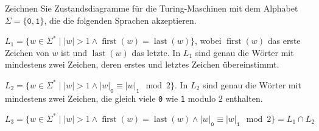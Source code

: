 Zeichnen Sie Zustandsdiagramme für die Turing-Maschinen
mit dem Alphabet $\Sigma=\{\texttt{0},\texttt{1}\}$, die die folgenden
Sprachen akzeptieren.
\begin{teilaufgaben}
\item
\(
L_1
=
\{ w\in\Sigma^*
\mid 
|w| > 1
\wedge
\operatorname{first}(w) = \operatorname{last}(w)
\}
\),
wobei $\operatorname{first}(w)$ das erste Zeichen von $w$
ist und $\operatorname{last}(w)$ das letzte.
In $L_1$ sind genau die Wörter mit mindestens zwei Zeichen, deren erstes und
letztes Zeichen übereinstimmt.
\item
\(
L_2
=
\{ w\in\Sigma^*
\mid 
|w| > 1
\wedge
|w|_{\texttt{0}} \equiv |w|_{\texttt{1}} \mod 2
\}
\).
In $L_2$ sind genau die Wörter mit mindestens zwei Zeichen, 
die gleich viele \texttt{0} wie \texttt{1} modulo $2$ enthalten.
\item
\(
L_3
=
\{ w\in\Sigma^*
\mid 
|w| > 1
\wedge
\operatorname{first}(w) = \operatorname{last}(w)
\wedge
|w|_{\texttt{0}} \equiv |w|_{\texttt{1}} \mod 2
\}
=
L_1\cap L_2
\)
\end{teilaufgaben}


